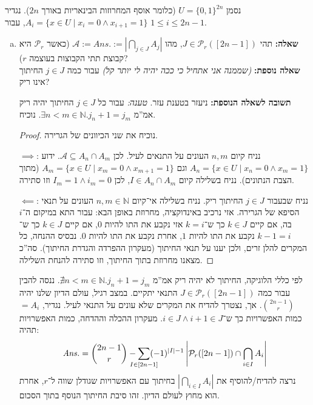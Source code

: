 \documentclass[]{article}
\newcommand\N     {\mathbb{N}}
\newcommand\ps    {\mathcal{P}}
\newcommand\ac    {\mathcal{A}}
\newcommand\ans   {\mathit{Ans.}}
\newcommand\sof[1]    {\left | #1 \right |}
\begin{document}
	\section{} %
	נסמן $U = \{0, 1\}^{2n}$ (כלומר אוסף המחרוזות הבינאריות באורך $ 2n $). נגדיר $A_i = \{x \in U \mid x_i = 0 \land x_{i + 1} = 1\}$, עבור $1 \le i \le 2n - 1$. 
	\begin{enumerate}[(a)]
		\item \textbf{שאלה: }תהי $J \in \ps_r([2n - 1])$, מהו $\ac := \ans := \sof{\bigcap_{j \in J} A_j}$ (כאשר $\ps_r$ היא קבוצת תתי הקבוצות בעוצמה $r$)? \\
		\textbf{שאלה נוספת: }\textit{(שממנה אני אתחיל כי ככה יהיה לי יותר קל)} עבור כמה $j \in J$ החיתוך אינו ריק? 
		
		\textbf{תשובה לשאלה הנוספת: }ניעזר בטענת עזר. 
		\textit{טענה: }עבור כל $j \in J$ החיתוך יהיה ריק אמ''מ $\exists n < m \in \N. j_n + 1 = j_m$. נוכיח. \begin{proof}נוכיח את שני הכיוונים של הגרירה. 
			
			$\implies$\!\!: נניח קיום $n, m$ העונים על התנאים לעיל. לכן $\ac \subseteq A_n \cap A_m$. ידוע $A_n = \{x \in U \mid x_n = 0 \land x_m = 1\}$ וגם $A_m = \{x \in U \mid x_m = 0 \land x_{m + 1} = 1\}$ (מתוך הצבת הנתונים). נניח בשלילה קיום $I \in A_n \cap A_m$, לכן $I_m = 1 \land i_m = 0$ וזו סתירה. 
			
			$\impliedby$\!: נניח שבעבור $j \in J$ החיתוך ריק. נניח בשלילה אי־קיום $n, m \in \N$ העונים על תנאי הסיפא של הגרירה. אזי נרכיב באינדוקציה, מחרוזת באופן הבא: עבור התא במיקום ה־$i$ בה, אם קיים $k \in J$ כך ש־$k = i$ אזי נקבע את התו להיות $0$, אם קיים $k \in J$ כך ש־$k - 1 = i$ נקבע את התו להיות $1$, אחרת נקבע את התו להיות $0$. נבסיס ההנחה, כל המקרים להלן זרים, ולכן יענו על תנאי החיתוך (מעקרון ההפרדה והגדרת החיתוך). סה''כ מצאנו מחרוזת בתוך החיתוך, וזו סתירה להנחת השלילה. 
		\end{proof}
		
		לפי כללי הלוגיקה, החיתוך לא יהיה ריק אמ''מ $\nexists n < m \in \N. j_n + 1 = j_m$. ננסה להבין עבור כמה $J \in \ps_r([2n - 1])$ התנאי יתקיים. במצב רגיל, עולם הדיון שלנו יהיה $\binom{2n - 1}{r}$. אך, נצטרך להדיח את המקרים שלא עונים על התנאי לעיל. נגדיר, $= A_i$ כמות האפשרויות כך ש־$i \in J \land i + 1 \in J$. מעקרון ההכלה וההדחה, כמות האפשרויות תהיה: 
		\[ \ans = \binom{2n - 1}{r} - \sum_{\mathclap{I \in [2n - 1]}} (-1)^{|I| - 1}\sof{\ps_r([2n - 1]) \cap \bigcap_{i \in I}A_i} \]
		נרצה להדיח/להוסיף את $\sof{\bigcap_{i \in I}A_i}$ בחיתוך עם האפשרויות שגודלן שווה ל־$r$, אחרת הוא מחוץ לעולם הדיון. זהו סיבת החיתוך הנוסף בתוך הסכום. 
		

\end{enumerate}
\end{document}
